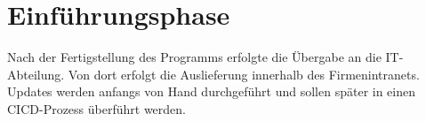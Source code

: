 \section{Einführungsphase}
\label{sec:Einfuehrungsphase}
Nach der Fertigstellung des Programms erfolgte die Übergabe an die IT-Abteilung.
Von dort erfolgt die Auslieferung innerhalb des Firmenintranets.
Updates werden anfangs von Hand durchgeführt und sollen später in einen
\ac{CICD}-Prozess überführt werden.
